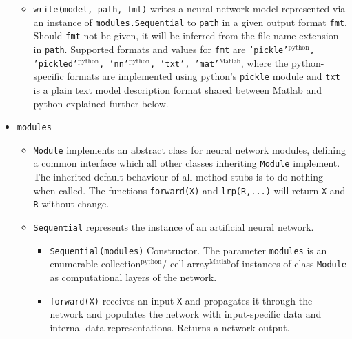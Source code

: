 \documentclass[a4wide]{article}
\newcommand{\mat}{$^\text{Matlab}$}
\newcommand{\py}{$^\text{python}$}
\begin{document}
\begin{itemize}
\begin{itemize}
		\item \texttt{write(model, path, fmt)} writes a neural network model represented via an instance of \texttt{modules.Sequential} to \texttt{path} in a given output format \texttt{fmt}. Should \texttt{fmt} not be given, it will be inferred from the file name extension in \texttt{path}. Supported formats and values for \texttt{fmt} are \texttt{'pickle'\py , 'pickled'\py , 'nn'\py, 'txt', 'mat'\mat}, where the python-specific formats are implemented using python's \texttt{pickle} module and \texttt{txt} is a plain text model description format shared between Matlab and python explained further below.
		
		
	\end{itemize}
\item \texttt{modules}
	\begin{itemize}
	
		\item \texttt{Module} implements an abstract class for neural network modules, defining a common interface which all other classes inheriting \texttt{Module} implement. The inherited default behaviour of all method stubs is to do nothing when called. The functions \texttt{forward(X)} and \texttt{lrp(R,...)} will return \texttt{X} and \texttt{R} without change.
		
		\item \texttt{Sequential} represents the instance of an artificial neural network.
			\begin{itemize}
				\item \texttt{Sequential(modules)} Constructor. The parameter \texttt{modules} is an enumerable collection\py / cell array\mat of instances of class \texttt{Module} as computational layers of the network.
				
				\item \texttt{forward(X)} receives an input \texttt{X} and propagates it through the network and populates the network with input-specific data and internal data representations. Returns a network output.
				

\end{itemize}
\end{itemize}
\end{itemize}
\end{document}
